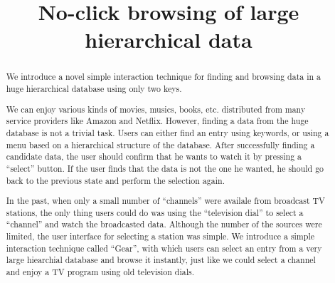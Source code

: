 \documentclass[conference]{IEEEtran}
\begin{document}
\title{No-click browsing of large hierarchical data}
%
%

\author{
\and
{}
}

\maketitle

\begin{abstract}
We introduce a novel simple interaction technique for finding and browsing
data in a huge hierarchical database using only two keys.

We can enjoy various kinds of movies, musics, books,
etc. distributed from many service providers like Amazon and Netflix.
However, 
finding a data from the huge database is not a trivial task. Users can
either find an entry using keywords, or using a menu based
on a hierarchical structure of the database.
After successfully finding a candidate data,
the user should confirm that he wants to watch it by pressing a ``select'' button.
If the user finds that the data is not the one he wanted,
he should go back to the previous state and perform the selection again.

In the past, when only a small number of ``channels'' were availale
from broadcast TV stations, the only thing users could do was
using the ``television dial'' to select a ``channel'' and watch the
broadcasted data.
Although the number of the sources were limited,
the user interface for selecting a station was simple.
%
We introduce a simple interaction technique called ``Gear'',
with which users can select an entry from a very large hiearchial database and
browse it instantly, just like we could select a channel and enjoy a TV program
using old television dials.
\end{abstract}
\end{document}
